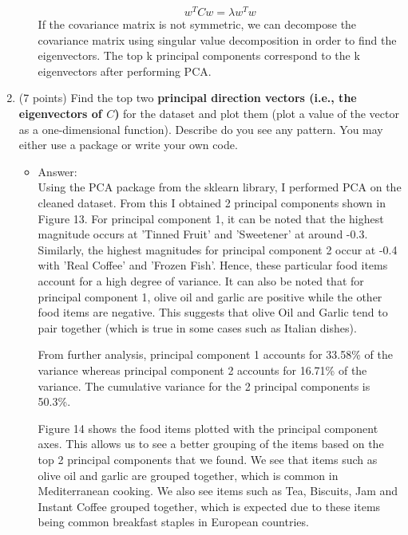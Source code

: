 \documentclass[twoside,10pt]{article}
\begin{document}
\begin{enumerate}
\begin{itemize}
$$w^{T}Cw = \lambda w^{T}w$$
If the covariance matrix is not symmetric, we can decompose the covariance matrix using singular value decomposition in order to find the eigenvectors. The top k principal components correspond to the k eigenvectors after performing PCA.

\end{itemize}

\item (7 points) Find the top two {\bf principal direction vectors (i.e., the eigenvectors of $C$)} for the dataset and plot them (plot a value of the vector as a one-dimensional function). Describe do you see any pattern. You may either use a package or write your own code. 
\begin{itemize}
\item Answer:\\
Using the PCA package from the sklearn library, I performed PCA on the cleaned dataset. From this I obtained 2 principal components shown in Figure 13. For principal component 1, it can be noted that the highest magnitude occurs at 'Tinned Fruit' and 'Sweetener' at around -0.3. Similarly, the highest magnitudes for principal component 2 occur at -0.4 with 'Real Coffee' and 'Frozen Fish'. Hence, these particular food items account for a high degree of variance. It can also be noted that for principal component 1, olive oil and garlic are positive while the other food items are negative. This suggests that olive Oil and Garlic tend to pair together (which is true in some cases such as Italian dishes).

From further analysis, principal component 1 accounts for 33.58\% of the variance whereas principal component 2 accounts for 16.71\% of the variance. The cumulative variance for the 2 principal components is 50.3\%.

Figure 14 shows the food items plotted with the  principal component axes. This allows us to see a better grouping of the items based on the top 2 principal components that we found. We see that items such as olive oil and garlic are grouped together, which is common in Mediterranean cooking. We also see items such as Tea, Biscuits, Jam and Instant Coffee grouped together, which is expected due to these items being common breakfast staples in European countries.

\end{itemize}


\end{enumerate}
\end{document}
